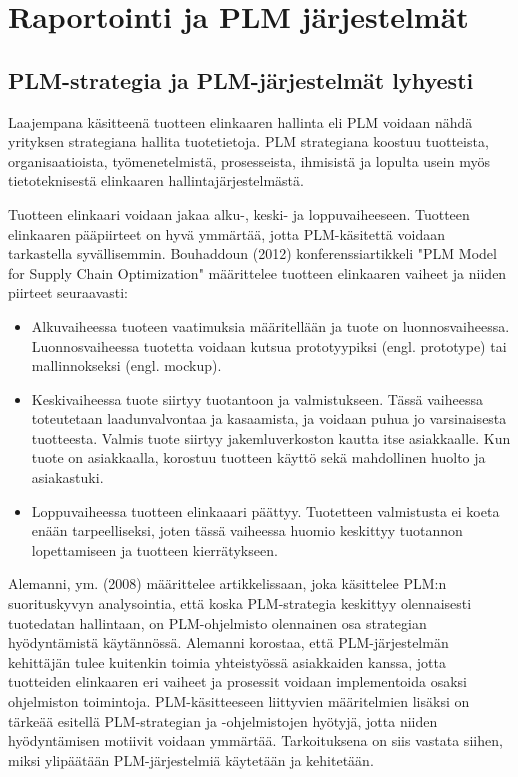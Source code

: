 \chapter{Raportointi ja PLM järjestelmät} \label{Raportointi ja PLM järjestelmät}

\section{PLM-strategia ja PLM-järjestelmät lyhyesti} \label{PLM-järjestelmät}

Laajempana käsitteenä tuotteen elinkaaren hallinta eli PLM voidaan nähdä yrityksen strategiana hallita tuotetietoja. PLM strategiana koostuu tuotteista, organisaatioista, työmenetelmistä, prosesseista, ihmisistä ja lopulta usein myös tietoteknisestä elinkaaren hallintajärjestelmästä.

Tuotteen elinkaari voidaan jakaa alku-, keski- ja loppuvaiheeseen. Tuotteen elinkaaren pääpiirteet on hyvä ymmärtää, jotta PLM-käsitettä voidaan tarkastella syvällisemmin. Bouhaddoun (2012) konferenssiartikkeli "PLM Model for Supply Chain Optimization" määrittelee tuotteen elinkaaren vaiheet ja niiden piirteet seuraavasti:

\begin{itemize}
	\item Alkuvaiheessa tuoteen vaatimuksia määritellään ja tuote on luonnosvaiheessa. Luonnosvaiheessa tuotetta voidaan kutsua prototyypiksi (engl. prototype) tai mallinnokseksi (engl. mockup).
	\item Keskivaiheessa tuote siirtyy tuotantoon ja valmistukseen. Tässä vaiheessa toteutetaan laadunvalvontaa ja kasaamista, ja voidaan puhua jo varsinaisesta tuotteesta. Valmis tuote siirtyy jakemluverkoston kautta itse asiakkaalle. Kun tuote on asiakkaalla, korostuu tuotteen käyttö sekä mahdollinen huolto ja asiakastuki.
	\item Loppuvaiheessa tuotteen elinkaaari päättyy. Tuotetteen valmistusta ei koeta enään tarpeelliseksi, joten tässä vaiheessa huomio keskittyy tuotannon lopettamiseen ja tuotteen kierrätykseen.
\end{itemize}
\cite{bouhaddou_plm_2012}

Alemanni, ym. (2008) määrittelee artikkelissaan, joka käsittelee PLM:n suorituskyvyn analysointia, että koska PLM-strategia keskittyy olennaisesti tuotedatan hallintaan, on PLM-ohjelmisto olennainen osa strategian hyödyntämistä käytännössä. \cite{alemanni_key_2008} Alemanni korostaa, että PLM-järjestelmän kehittäjän tulee kuitenkin toimia yhteistyössä asiakkaiden kanssa, jotta tuotteiden elinkaaren eri vaiheet ja prosessit voidaan implementoida osaksi ohjelmiston toimintoja. PLM-käsitteeseen liittyvien määritelmien lisäksi on tärkeää esitellä PLM-strategian ja -ohjelmistojen hyötyjä, jotta niiden hyödyntämisen motiivit voidaan ymmärtää. Tarkoituksena on siis vastata siihen, miksi ylipäätään PLM-järjestelmiä käytetään ja kehitetään. 

